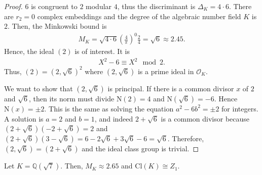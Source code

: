 \begin{proof}
    \(6\) is congruent to \(2\) modular \(4\), thus the discriminant is \(\Delta_K = 4 \cdot 6\). There are \(r_2 = 0\) complex embeddings and the degree of the algebraic number field \(K\) is \(2\). Then, the Minkowski bound is
    \begin{align*}
        M_K = \sqrt{4 \cdot 6} \left(\frac{4}{\pi}\right)^0 \frac{2}{4} = \sqrt{6} \approx 2.45 \text{.}
    \end{align*}
    Hence, the ideal \((2)\) is of interest. It is
    \begin{align*}
        X^2 - 6 \equiv X^2 \mod{2} \text{.}
    \end{align*}
    Thus, \((2) = (2, \sqrt{6})^2\) where \((2, \sqrt{6})\) is a prime ideal in \(\mathcal{O}_K\).

    We want to show that \((2, \sqrt{6})\) is principal. If there is a common divisor \(x\) of \(2\) and \(\sqrt{6}\), then its norm must divide \(\mathrm{N}(2) = 4\) and \(\mathrm{N}(\sqrt{6}) = -6\). Hence \(\mathrm{N}(x) = \pm 2\). This is the same as solving the equation \(a^2 - 6b^2 = \pm 2\) for integers. A solution is \(a = 2\) and \(b = 1\), and indeed \(2 + \sqrt{6}\) is a common divisor because \((2 + \sqrt{6})(- 2 + \sqrt{6}) = 2\) and \((2 + \sqrt{6})(3 - \sqrt{6}) = 6 - 2\sqrt{6} + 3\sqrt{6} - 6 = \sqrt{6}\). Therefore, \((2, \sqrt{6}) = (2 + \sqrt{6})\) and the ideal class group is trivial.
\end{proof}

\begin{example}
    Let \(K = \mathbb{Q}(\sqrt{7})\). Then, \(M_K \approx 2.65\) and \(\mathrm{Cl}(K) \cong Z_1\).
\end{example}

